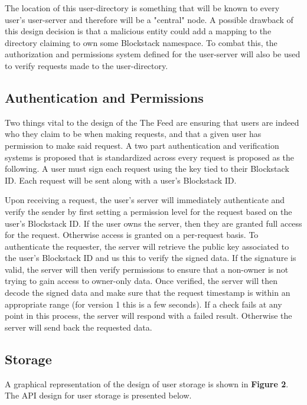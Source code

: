 \documentclass[pageno]{jpaper}
\begin{document}
\begin{multicols*}{2}
	
The location of this user-directory is something that will be known to every user's user-server and therefore will be a "central" node. A possible drawback of this design decision is that a malicious entity could add a mapping to the directory claiming to own some Blockstack namespace. To combat this, the authorization and permissions system defined for the user-server will also be used to verify requests made to the user-directory.
	
\subsection{Authentication and Permissions}
\label{section:userauth}

Two things vital to the design of the The Feed are ensuring that users are indeed who they claim to be when making requests, and that a given user has permission to make said request. A two part authentication and verification systems is proposed that is standardized across every request is proposed as the following. A user must sign each request using the key tied to their Blockstack ID. Each request will be sent along with a user's Blockstack ID.\par
Upon receiving a request, the user's server will immediately authenticate and verify the sender by first setting a permission level for the request based on the user's Blockstack ID. If the user owns the server, then they are granted full access for the request. Otherwise access is granted on a per-request basis. To authenticate the requester, the server will retrieve the public key associated to the user's Blockstack ID and us this to verify the signed data. If the signature is valid, the server will then verify permissions to ensure that a non-owner is not trying to gain access to owner-only data. Once verified, the server will then decode the signed data and make sure that the request timestamp is within an appropriate range (for version 1 this is a few seconds). If a check fails at any point in this process, the server will respond with a failed result. Otherwise the server will send back the requested data.

\subsection{Storage}
\label{section:storage}

A graphical representation of the design of user storage is shown in \textbf{Figure 2}. The API design for user storage is presented below.\par


\end{multicols*}
\end{document}
